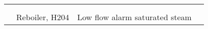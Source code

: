 \begin{table}[p]
\begin{tabularx}{\linewidth}{@{}l>{\raggedright}p{2cm}XX@{}}
    &                           &                                                                                                                                                               &                                                                                                                                                                                                              \\ \cmidrule(l){3-4} 
    &                           &                                                                                                                                                               &                                                                                                                                                                                                              \\ \cmidrule(l){2-4} 
    & Reboiler, H204            & Low flow alarm saturated steam                                                                                                                                &                                                                                                                                                                                                              \\ \bottomrule
\end{tabularx}%
\end{table}
